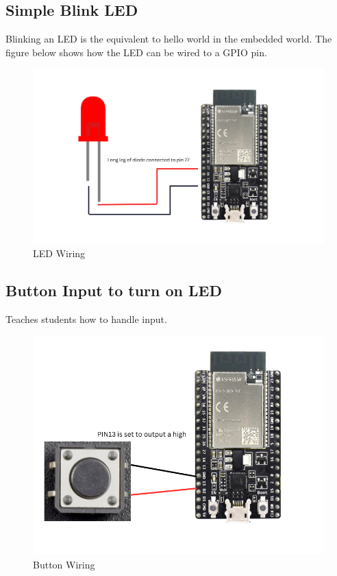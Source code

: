 \documentclass[a4paper,12pt]{report}
\begin{document}
\subsection*{Simple Blink LED}
Blinking an LED is the equivalent to hello world in the embedded world. The figure below shows how the LED can be wired to a GPIO pin. 
\begin{figure}[H]
  \centering
  \includegraphics[scale=0.3]{led.png}
  \caption{LED Wiring}
  \label{fig:led}
\end{figure}
\subsection*{Button Input to turn on LED}
Teaches students how to handle input.
\begin{figure}[H]
  \centering
  \includegraphics[scale = 0.3]{button.png}
  \caption{Button Wiring}
  \label{fig:button}
\end{figure}
\end{document}
